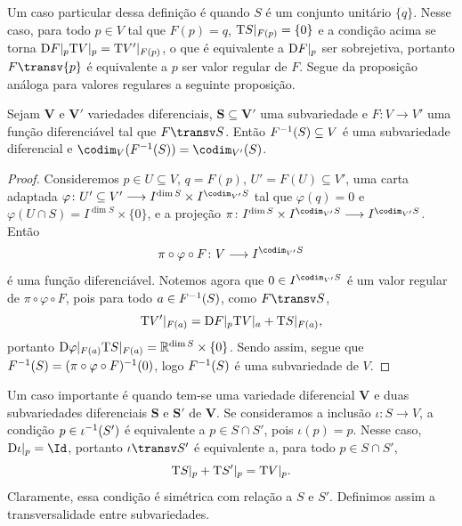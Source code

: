 Um caso particular dessa definição é quando $S$ é um conjunto unitário $\{q\}$. Nesse caso, para todo $p \in V$ tal que $F(p)=q$,  $\mathrm{T} S|_{F(p)} = \{0\}$ e a condição acima se torna $\mathrm{D} F|_p\mathrm{T} V|_p = \mathrm{T} V'|_{F(p)}$, o que é equivalente a $\mathrm{D} F|_p$ ser sobrejetiva, portanto $F \transv \{p\}$ é equivalente a $p$ ser valor regular de $F$. Segue da proposição análoga para valores regulares a seguinte proposição.

\begin{prop}
Sejam $\bm V$ e $\bm V'$ variedades diferenciais, $\bm S \subseteq \bm V'$ uma subvariedade e $F\colon V \to V'$ uma função diferenciável tal que $F \transv S$. Então $F^{-1}(S) \subseteq V$ é uma subvariedade diferencial e $\codim_V(F\inv(S)) = \codim_{V'}(S)$.
\end{prop}
\begin{proof}
Consideremos $p \in U \subseteq V$, $q=F(p)$, $U'=F(U) \subseteq V'$, uma carta adaptada $\varphi\colon U' \subseteq V' \to I^{\dim S} \times I^{\codim_{V'} S}$ tal que $\varphi(q)=0$ e $\varphi(U \cap S) = I^{\dim S} \times \{0\}$, e a projeção $\pi\colon I^{\dim S} \times I^{\codim_{V'} S} \to I^{\codim_{V'} S}$. Então
	\begin{equation*}
	\pi \circ \varphi \circ F\colon V \to I^{\codim_{V'} S}
	\end{equation*}
é uma função diferenciável. Notemos agora que $0 \in I^{\codim_{V'} S}$ é um valor regular de $\pi \circ \varphi \circ F$, pois para todo $a \in F^{-1}(S)$, como $F \transv S$,
	\begin{equation*}
	\mathrm{T} V'|_{F(a)} = \mathrm{D} F|_p \mathrm{T} V|_a + \mathrm{T} S|_{F(a)},
	\end{equation*}
portanto $\mathrm{D} \varphi|_{F(a)} \mathrm{T} S|_{F(a)} = \mathbb{R}^{\dim S} \times \{0\}$. Sendo assim, segue que $F^{-1}(S) = (\pi \circ \varphi \circ F)^{-1}(0)$, logo $F^{-1}(S)$ é uma subvariedade de $V$.
\end{proof}

Um caso importante é quando tem-se uma variedade diferencial $\bm V$ e duas subvariedades diferenciais $\bm S$ e $\bm S'$ de $\bm V$. Se consideramos a inclusão $\iota\colon S \to V$, a condição $p \in \iota^{-1}(S')$ é equivalente a $p \in S \cap S'$, pois $\iota(p)=p$. Nesse caso, $\D\iota|_p=\Id$, portanto $\iota \transv S'$ é equivalente a, para todo $p \in S \cap S'$,
	\begin{equation*}
	\mathrm{T} S|_p + \mathrm{T} S'|_{p} = \mathrm{T} V|_{p}.
	\end{equation*}
Claramente, essa condição é simétrica com relação a $S$ e $S'$. Definimos assim a transversalidade entre subvariedades.

